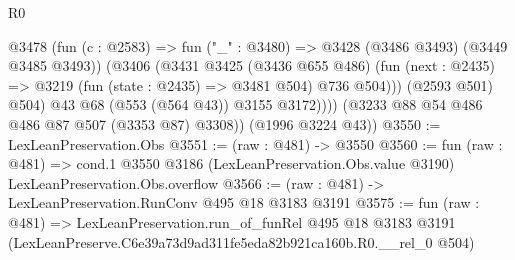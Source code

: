 \begin{lexlean}{R0}
\begin{coremodule}
                @3478
                  (fun (c : @2583) => fun ("_" : @3480) => @3428 (@3486 @3493) (@3449 @3485 @3493))
                  (@3406
                    (@3431
                      @3425
                      (@3436 @655 @486)
                      (fun (next : @2435) => @3219 (fun (state : @2435) => @3481 @504) @736 @504)))
                  (@2593 @501)
                  @504)
                @43
                @68
                (@553 (@564 @43))
                @3155
                @3172))))
        (@3233 @88 @54 @486 @486 @87 @507 (@3353 @87) @3308))
      (@1996 @3224 @43))
@3550 := LexLeanPreservation.Obs
@3551 := (raw : @481) -> @3550
@3560 := fun (raw : @481) =>
  cond.{1} @3550 @3186 (LexLeanPreservation.Obs.value @3190) LexLeanPreservation.Obs.overflow
@3566 := (raw : @481) -> LexLeanPreservation.RunConv @495 @18 @3183 @3191
@3575 := fun (raw : @481) =>
  LexLeanPreservation.run_of_funRel
    @495
    @18
    @3183
    @3191
    (LexLeanPreserve.C6e39a73d9ad311fe5eda82b921ca160b.R0.__rel_0 @504)
\end{coremodule}
\end{lexlean}
